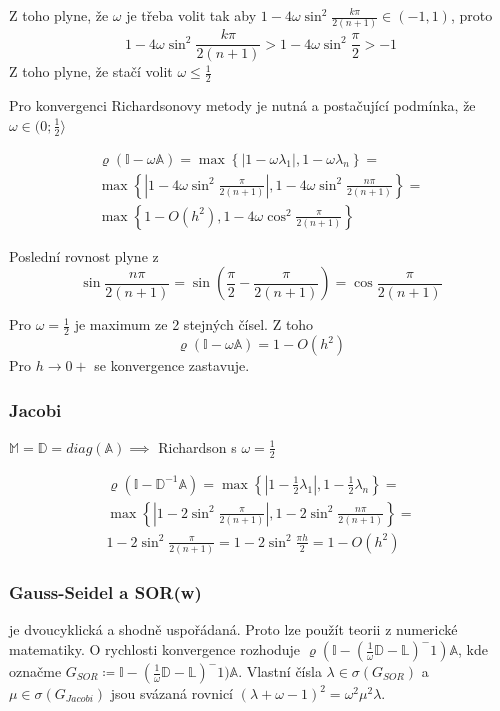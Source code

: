 \documentclass[../main.tex]{subfiles}
\begin{document}
Z toho plyne, že $\omega$ je třeba volit tak aby $1 - 4\omega \sin^2 \frac{k\pi}{2(n+1)} \in (-1,1)$, proto\begin{equation*}
    1 - 4\omega \sin^2 \frac{k\pi}{2(n+1)} > 1 - 4\omega \sin^2 \frac{\pi}{2} > -1
\end{equation*}
Z toho plyne, že stačí volit $\omega \leq \frac{1}{2}$

Pro konvergenci Richardsonovy metody je nutná a postačující podmínka, že $\omega\in(0;\frac{1}{2}\rangle$

\begin{multline*}
    \varrho(\mathbb{I} - \omega \mathbb{A}) = \max \left\{ |1-\omega\lambda_1|, 1 - \omega\lambda_n  \right\} =\\
    \max \left\{ |1-4\omega \sin^2 \frac{\pi}{2(n+1)}|, 1 - 4\omega \sin^2 \frac{n\pi}{2(n+1)}  \right\} =\\
    \max \left\{ 1-O(h^2), 1 - 4\omega \cos^2 \frac{\pi}{2(n+1)}  \right\}
\end{multline*}

Poslední rovnost plyne z \begin{equation*}
    \sin\frac{n\pi}{2(n+1)} = \sin \left(\frac{\pi}{2} - \frac{\pi}{2(n+1)}\right) = \cos \frac{\pi}{2(n+1)}
\end{equation*}

Pro $\omega = \frac{1}{2}$ je maximum ze 2 stejných čísel. Z toho\begin{equation*}
    \varrho(\mathbb{I} - \omega \mathbb{A}) = 1 - O(h^2)
\end{equation*}
Pro $h \rightarrow 0+$ se konvergence zastavuje.


\subsubsection{Jacobi}

$\mathbb{M} = \mathbb{D} = diag(\mathbb{A}) \implies$ Richardson s $\omega = \frac{1}{2}$

\begin{multline*}
    \varrho(\mathbb{I} - \mathbb{D}^{-1}\mathbb{A}) = \max \left\{  |1-\frac{1}{2}\lambda_1|, 1 - \frac{1}{2}\lambda_n \right\} =\\
    \max \left\{ |1-2 \sin^2 \frac{\pi}{2(n+1)}|, 1 - 2 \sin^2 \frac{n\pi}{2(n+1)}  \right\} =\\ 1 - 2 \sin^2 \frac{\pi}{2(n+1)}
    = 1 - 2 \sin^2 \frac{\pi h}{2} = 1 - O(h^2)
\end{multline*}

\subsubsection{Gauss-Seidel a SOR(w)}
\matA je dvoucyklická a shodně uspořádaná. Proto lze použít teorii z numerické matematiky. O rychlosti konvergence rozhoduje
$\varrho(\mathbb{I} - (\frac{1}{\omega}\mathbb{D} -\mathbb{L})^-1 )\mathbb{A}$, kde označme $G_{SOR} \coloneq \mathbb{I} - (\frac{1}{\omega}\mathbb{D} -\mathbb{L})^-1 )\mathbb{A}$.
Vlastní čísla $\lambda\in\sigma(G_{SOR})$ a $\mu \in \sigma(G_{Jacobi})$ jsou svázaná rovnicí 
$(\lambda + \omega -1 )^2 = \omega^2 \mu^2 \lambda$.
\end{document}
